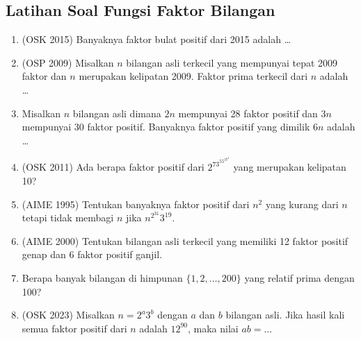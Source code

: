 \subsection{Latihan Soal Fungsi Faktor Bilangan}
\begin{enumerate}
    \item (OSK 2015) Banyaknya faktor bulat positif dari 2015 adalah \ldots

    \item (OSP 2009) Misalkan $n$ bilangan asli terkecil yang mempunyai tepat 2009 faktor dan $n$ merupakan kelipatan 2009. Faktor prima terkecil dari $n$ adalah \dots
    
    \item Misalkan $n$ bilangan asli dimana $2n$ mempunyai 28 faktor positif dan $3n$ mempunyai 30 faktor positif. Banyaknya faktor positif yang dimilik $6n$ adalah \dots
    
    \item (OSK 2011) Ada berapa faktor positif dari $2^73^55^37^2$ yang merupakan kelipatan 10?
    
    \item (AIME 1995) Tentukan banyaknya faktor positif dari $n^2$ yang kurang dari $n$ tetapi tidak membagi $n$ jika $n^{2^{31}}3^{19}.$
    
    \item (AIME 2000) Tentukan bilangan asli terkecil yang memiliki 12 faktor positif genap dan $6$ faktor positif ganjil.

    \item Berapa banyak bilangan di himpunan $\{1,2,\dots,200\}$ yang relatif prima dengan 100?

    \item (OSK 2023) Misalkan $n=2^a3^b$ dengan $a$ dan $b$ bilangan asli. Jika hasil kali semua faktor positif dari $n$ adalah $12^{90}$, maka nilai $ab = \ldots$ 
\end{enumerate}